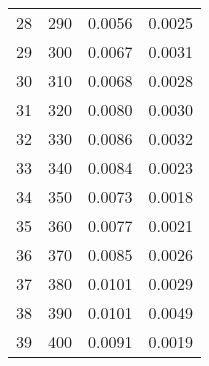 \begin{table}
\begin{adjustbox}{width=1\textwidth/2}
\begin{tabular}{|c|c|c|c|}
\cline{1-4}
28 & 290 & 0.0056 & 0.0025 \\
\cline{1-4}
29 & 300 & 0.0067 & 0.0031 \\
\cline{1-4}
30 & 310 & 0.0068 & 0.0028 \\
\cline{1-4}
31 & 320 & 0.0080 & 0.0030 \\
\cline{1-4}
32 & 330 & 0.0086 & 0.0032 \\
\cline{1-4}
33 & 340 & 0.0084 & 0.0023 \\
\cline{1-4}
34 & 350 & 0.0073 & 0.0018 \\
\cline{1-4}
35 & 360 & 0.0077 & 0.0021 \\
\cline{1-4}
36 & 370 & 0.0085 & 0.0026 \\
\cline{1-4}
37 & 380 & 0.0101 & 0.0029 \\
\cline{1-4}
38 & 390 & 0.0101 & 0.0049 \\
\cline{1-4}
39 & 400 & 0.0091 & 0.0019 \\
\cline{1-4}
\end{tabular}
\end{adjustbox}
\end{table}

